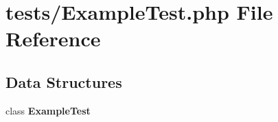 \section{tests/\+Example\+Test.php File Reference}
\label{_example_test_8php}
\subsection*{Data Structures}
\begin{DoxyCompactItemize}
\item 
class {\bf Example\+Test}
\end{DoxyCompactItemize}
